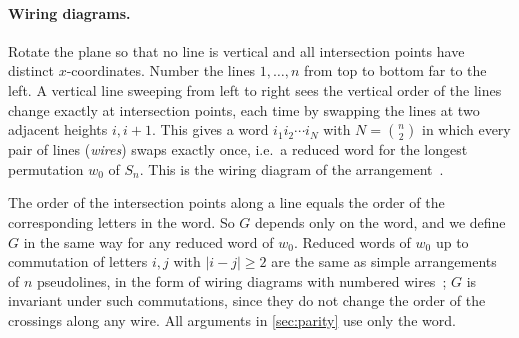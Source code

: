 \paragraph{Wiring diagrams.}
Rotate the plane so that no line is vertical and all intersection points have distinct
$x$-coordinates. Number the lines $1,\dots,n$ from top to bottom far to the left. A vertical line
sweeping from left to right sees the vertical order of the lines change exactly at intersection
points, each time by swapping the lines at two adjacent heights $i,i+1$. This gives a word
$i_1i_2\cdots i_N$ with $N=\binom n2$ in which every pair of lines (\emph{wires}) swaps exactly once,
i.e.\ a reduced word for the longest permutation $w_0$ of $S_n$. This is the wiring diagram of the
arrangement~\cite{Goodman1980,GoodmanPollack1984,FelsnerGoodman2017}.

The order of the intersection points along a line equals the order of the corresponding letters in
the word. So $G$ depends only on the word, and we define $G$ in the same way for any reduced word of
$w_0$. Reduced words of $w_0$ up to commutation of letters $i,j$ with $|i-j|\ge2$ are the same as
simple arrangements of $n$ pseudolines, in the form of wiring diagrams with numbered
wires~\cite{FelsnerGoodman2017}; $G$ is invariant under such commutations, since they do not change the
order of the crossings along any wire. All arguments in \cref{sec:parity} use only the word.
